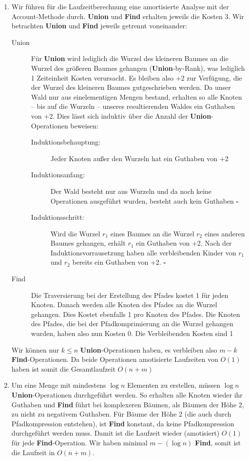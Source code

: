 \documentclass[a4paper,10pt]{article}
\begin{document}
\begin{enumerate}
\item Wir führen für die Laufzeitberechnung eine amortisierte Analyse mit der Account-Methode durch. \textbf{Union} und \textbf{Find} erhalten jeweils die Kosten 3.
        Wir betrachten \textbf{\textbf{Union}} und \textbf{\textbf{Find}} jeweils getrennt voneinander:
        \begin{description}
        \item[Union] Für \textbf{Union} wird lediglich die Wurzel des kleineren Baumes an die Wurzel des größeren Baumes gehangen (\textbf{Union}-by-Rank), was lediglich 1 Zeiteinheit Kosten verursacht. Es bleiben also +2 zur Verfügung, die der Wurzel des kleineren Baumes gutgeschrieben werden. Da unser Wald nur aus einelementigen Mengen bestand, erhalten so alle Knoten -- bis auf die Wurzeln -- unseres resultierenden Waldes ein Guthaben von +2. Dies lässt sich induktiv über die Anzahl der \textbf{Union}-Operationen beweisen:
            \begin{description}
            \item[Induktionsbehauptung:] Jeder Knoten außer den Wurzeln hat ein Guthaben von +2
            \item[Induktionsanfang:] Der Wald besteht nur aus Wurzeln und da noch keine Operationen ausgeführt wurden, besteht auch kein Guthaben \hfill$\square$
            \item[Induktionsschritt:] Wird die Wurzel $r_1$ eines Baumes an die Wurzel $r_2$ eines anderen Baumes gehangen, erhält $r_1$ ein Guthaben von +2. Nach der Induktionsvorrausetzung haben alle verbleibenden Kinder von $r_1$ und $r_2$ bereits ein Guthaben von +2. \hfill$\square$
            \end{description}
        \item[Find] Die Traversierung bei der Erstellung des Pfades kostet 1 für jeden Knoten. Danach werden alle Knoten des Pfades an die Wurzel gehangen. Dies Kostet ebenfalls 1 pro Knoten des Pfades. Die Knoten des Pfades, die bei der Pfadkomprimierung an die Wurzel gehangen wurden, haben also nun Kosten 0. Die Verbleibenden Kosten sind 1
        \end{description}
        Wir können nur $k \leq n$ \textbf{Union}-Operationen haben, es verbleiben also $m-k$ \textbf{Find}-Operationen. Da beide Operationen amotisierte Laufzeiten von $O(1)$ haben ist somit die Gesamtlaufzeit $O(n+m)$
\item Um eine Menge mit mindestens $\log n$ Elementen zu erstellen, müssen $\log n$ \textbf{Union}-Operationen durchgeführt werden. So erhalten alle Knoten wieder ihr Guthaben und \textbf{Find} führt bei komplexeren Bäumen, als Bäumen der Höhe 2, zu nicht zu negativem Guthaben. Für Bäume der Höhe 2 (die auch durch Pfadkompression entstehen), ist \textbf{Find} konstant, da keine Pfadkompression durchgeführt werden muss. Damit ist die Laufzeit wieder (amotisiert) $O(1)$ für jede \textbf{Find}-Operation. Wir haben minimal $m-(\log n)$ \textbf{Find}, somit ist die Laufzeit in $O(n + m)$.
\end{enumerate}
\end{document}
